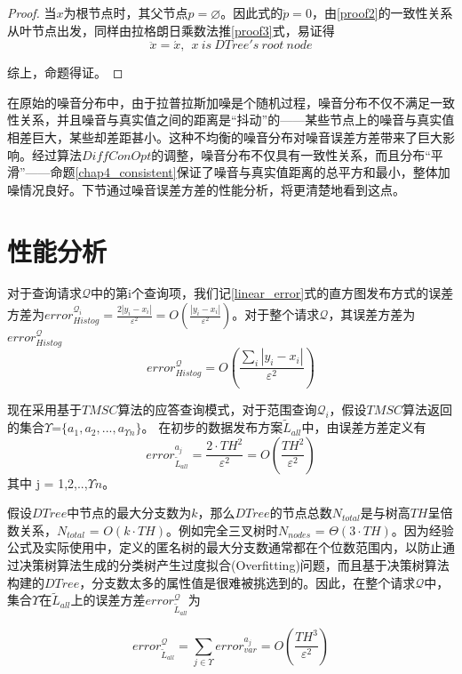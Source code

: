 \begin{proof}
	当$x$为根节点时，其父节点$p = \varnothing$。因此\label{proof1}式的$\ddot{p} = 0$，由\ref{proof2}的一致性关系从叶节点出发，同样由拉格朗日乘数法推\ref{proof3}式，易证得
	\[
		\ddot{x} = \acute{x},\ \ x\ is\ DTree's\ root\ node
	\]
	
	综上，命题得证。
\end{proof}

在原始的噪音分布中，由于拉普拉斯加噪是个随机过程，噪音分布不仅不满足一致性关系，并且噪音与真实值之间的距离是“抖动”的——某些节点上的噪音与真实值相差巨大，某些却差距甚小。这种不均衡的噪音分布对噪音误差方差带来了巨大影响。经过算法$DiffConOpt$的调整，噪音分布不仅具有一致性关系，而且分布“平滑”——命题\ref{chap4_consistent}保证了噪音与真实值距离的总平方和最小，整体加噪情况良好。下节通过噪音误差方差的性能分析，将更清楚地看到这点。

\section{性能分析}

对于查询请求$\mathcal{Q}$中的第i个查询项，我们记\ref{linear_error}式的直方图发布方式的误差方差为$error_{Histog}^{\mathcal{Q}_{i}} = \frac{2|y_{i}-x_{i}|}{\varepsilon^2} = O(\frac{|y_{i}-x_{i}|}{\varepsilon^2})$。对于整个请求$\mathcal{Q}$，其误差方差为$error_{Histog}^{\mathcal{Q}}$
\begin{equation}
\label{linear_error2}
error_{Histog}^{\mathcal{Q}} = O(\frac{\sum\limits_i |y_{i}-x_{i}|}{\varepsilon^2})
\end{equation}

现在采用基于$TMSC$算法的应答查询模式，对于范围查询$\mathcal{Q}_{i}$，假设$TMSC$算法返回的集合$\Upsilon$=$\{a_{1},a_{2},...,a_{\Upsilon n}\}$。
在初步的数据发布方案$\tilde{L}_{all}$中，由误差方差定义有
\[
	error_{\tilde{L}_{all}}^{a_{j}} = \frac{2 \cdotp TH^2}{\varepsilon^2} = O(\frac{TH^2}{\varepsilon^2})
\]
其中 j = 1,2,..,$\Upsilon n$。

假设$DTree$中节点的最大分支数为$k$，那么$DTree$的节点总数$N_{total}$是与树高$TH$呈倍数关系，$N_{total}$ = $O(k \cdotp TH)$。例如完全三叉树时$N_{nodes}$ = $\Theta(3 \cdotp TH)$。因为经验公式及实际使用中，定义的匿名树的最大分支数通常都在个位数范围内，以防止通过决策树算法生成的分类树产生过度拟合(Overfitting)\cite{overfitting}问题，而且基于决策树算法构建的$DTree$，分支数太多的属性值是很难被挑选到的。因此，在整个请求$\mathcal{Q}$中，集合$\Upsilon$在$\tilde{L}_{all}$上的误差方差$error_{\tilde{L}_{all}}^{\mathcal{Q}}$为

\[
\label{Lall_error}
error_{\tilde{L}_{all}}^{\mathcal{Q}} = \sum\limits_{j \in \Upsilon} error_{var}^{a_{j}}=O(\frac{TH^3}{\varepsilon^2})
\]

